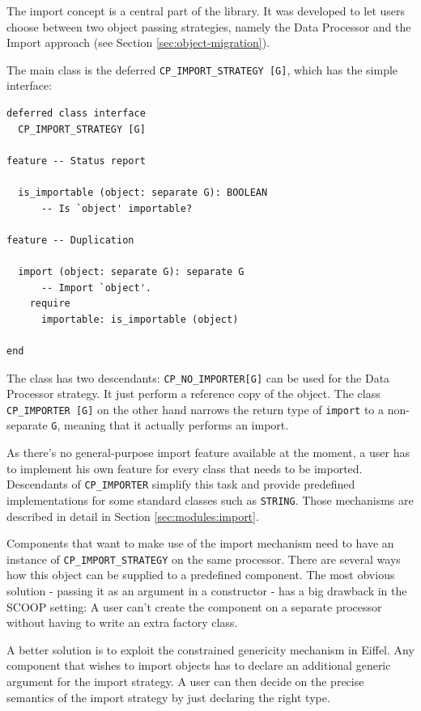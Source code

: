 \documentclass[a4paper,10pt]{article}
\begin{document}
The import concept is a central part of the library.
It was developed to let users choose between two object passing strategies, namely the Data Processor and the Import approach (see Section \ref{sec:object-migration}).

The main class is the deferred \lstinline!CP_IMPORT_STRATEGY [G]!, which has the simple interface:

\begin{lstlisting}[language=OOSC2Eiffel, captionpos=b, caption={The deferred class CP\_IMPORT\_STRATEGY.}]
deferred class interface
  CP_IMPORT_STRATEGY [G]

feature -- Status report

  is_importable (object: separate G): BOOLEAN
      -- Is `object' importable?

feature -- Duplication

  import (object: separate G): separate G
      -- Import `object'.
    require
      importable: is_importable (object)

end
\end{lstlisting}


The class has two descendants: \lstinline!CP_NO_IMPORTER[G]! can be used for the Data Processor strategy. 
It just perform a reference copy of the object.
The class \lstinline!CP_IMPORTER [G]! on the other hand narrows the return type of \lstinline!import! to a non-separate \lstinline!G!, meaning that it actually performs an import.

As there's no general-purpose import feature available at the moment, a user has to implement his own feature for every class that needs to be imported.
Descendants of \lstinline!CP_IMPORTER! simplify this task and provide predefined implementations for some standard classes such as \lstinline!STRING!.
Those mechanisms are described in detail in Section \ref{sec:modules:import}.

Components that want to make use of the import mechanism need to have an instance of \lstinline!CP_IMPORT_STRATEGY! on the same processor.
There are several ways how this object can be supplied to a predefined component.
The most obvious solution - passing it as an argument in a constructor - has a big drawback in the SCOOP setting:
A user can't create the component on a separate processor without having to write an extra factory class.

A better solution is to exploit the constrained genericity mechanism in Eiffel.
Any component that wishes to import objects has to declare an additional generic argument for the import strategy.
A user can then decide on the precise semantics of the import strategy by just declaring the right type.
\end{document}
